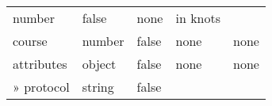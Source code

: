 \documentclass[
]{article}
\begin{document}
\begin{longtable}[]{@{}lllll@{}}
\begin{minipage}[t]{0.17\columnwidth}
number\strut
\end{minipage} & \begin{minipage}[t]{0.17\columnwidth}\raggedright
false\strut
\end{minipage} & \begin{minipage}[t]{0.17\columnwidth}\raggedright
none\strut
\end{minipage} & \begin{minipage}[t]{0.17\columnwidth}\raggedright
in knots\strut
\end{minipage}\tabularnewline
\begin{minipage}[t]{0.17\columnwidth}\raggedright
course\strut
\end{minipage} & \begin{minipage}[t]{0.17\columnwidth}\raggedright
number\strut
\end{minipage} & \begin{minipage}[t]{0.17\columnwidth}\raggedright
false\strut
\end{minipage} & \begin{minipage}[t]{0.17\columnwidth}\raggedright
none\strut
\end{minipage} & \begin{minipage}[t]{0.17\columnwidth}\raggedright
none\strut
\end{minipage}\tabularnewline
\begin{minipage}[t]{0.17\columnwidth}\raggedright
attributes\strut
\end{minipage} & \begin{minipage}[t]{0.17\columnwidth}\raggedright
object\strut
\end{minipage} & \begin{minipage}[t]{0.17\columnwidth}\raggedright
false\strut
\end{minipage} & \begin{minipage}[t]{0.17\columnwidth}\raggedright
none\strut
\end{minipage} & \begin{minipage}[t]{0.17\columnwidth}\raggedright
none\strut
\end{minipage}\tabularnewline
\begin{minipage}[t]{0.17\columnwidth}\raggedright
» protocol\strut
\end{minipage} & \begin{minipage}[t]{0.17\columnwidth}\raggedright
string\strut
\end{minipage} & \begin{minipage}[t]{0.17\columnwidth}\raggedright
false\strut

\end{minipage}
\end{longtable}
\end{document}
